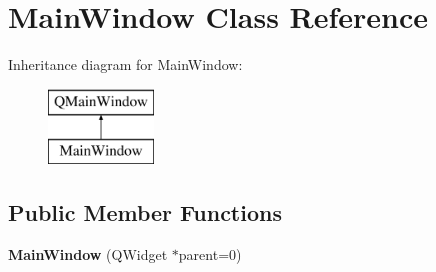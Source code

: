 \hypertarget{class_main_window}{}\section{Main\+Window Class Reference}
\label{class_main_window}
Inheritance diagram for Main\+Window\+:\begin{figure}[H]
\begin{center}
\leavevmode
\includegraphics[height=2.000000cm]{class_main_window}
\end{center}
\end{figure}
\subsection*{Public Member Functions}
\begin{DoxyCompactItemize}
\item 
\mbox{\label{class_main_window_a8b244be8b7b7db1b08de2a2acb9409db}} 
{\bfseries Main\+Window} (Q\+Widget $\ast$parent=0)
\end{DoxyCompactItemize}
